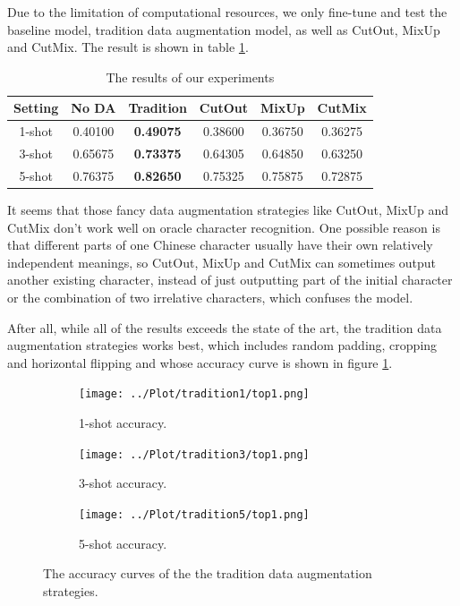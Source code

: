 \documentclass{article}
\begin{document}
Due to the limitation of computational resources, we only fine-tune and test the baseline model, tradition data augmentation model, as well as CutOut, MixUp and CutMix. The result is shown in table \ref{tab:results}.

\begin{table}[h]
	\centering
	\caption{The results of our experiments}
	\begin{tabular}{cccccc}
		\toprule
		Setting & No DA & Tradition & CutOut & MixUp & CutMix \\
		\midrule
		1-shot & 0.40100 & \textbf{0.49075}
		& 0.38600 & 0.36750 & 0.36275 \\
		3-shot & 0.65675 & \textbf{0.73375}
		& 0.64305 & 0.64850 & 0.63250 \\
		5-shot & 0.76375 & \textbf{0.82650}
		& 0.75325 & 0.75875 & 0.72875 \\
		\bottomrule
	\end{tabular}
	\label{tab:results}
\end{table}

It seems that those fancy data augmentation strategies like CutOut, MixUp and CutMix don't work well on oracle character recognition. One possible reason is that different parts of one Chinese character usually have their own relatively independent meanings, so CutOut, MixUp and CutMix can sometimes output another existing character, instead of just outputting part of the initial character or the combination of two irrelative characters, which confuses the model.

After all, while all of the results exceeds the state of the art, the tradition data augmentation strategies works best, which includes random padding, cropping and horizontal flipping and whose accuracy curve is shown in figure \ref{fig:result}.

\begin{figure}[h]
	\centering
	\begin{subfigure}{0.32\textwidth}
		\centering
		\texttt{[image: ../Plot/tradition1/top1.png]}
		\caption{1-shot accuracy.}
	\end{subfigure}
	\begin{subfigure}{0.32\textwidth}
		\centering
		\texttt{[image: ../Plot/tradition3/top1.png]}
		\caption{3-shot accuracy.}
	\end{subfigure}
	\begin{subfigure}{0.32\textwidth}
		\centering
		\texttt{[image: ../Plot/tradition5/top1.png]}
		\caption{5-shot accuracy.}
	\end{subfigure}
	\caption{The accuracy curves of the the tradition data augmentation strategies.}
	\label{fig:result}
\end{figure}
\end{document}
